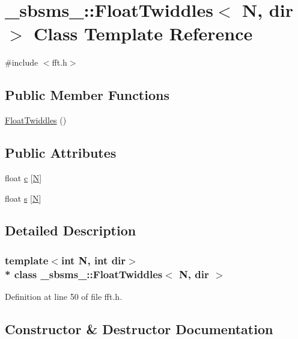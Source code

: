 \hypertarget{class__sbsms___1_1_float_twiddles}{}\section{\+\_\+sbsms\+\_\+\+:\+:Float\+Twiddles$<$ N, dir $>$ Class Template Reference}
\label{class__sbsms___1_1_float_twiddles}


{\ttfamily \#include $<$fft.\+h$>$}

\subsection*{Public Member Functions}
\begin{DoxyCompactItemize}
\item 
\hyperlink{class__sbsms___1_1_float_twiddles_afe30d2543750b6f34f1f98efee638d9a}{Float\+Twiddles} ()
\end{DoxyCompactItemize}
\subsection*{Public Attributes}
\begin{DoxyCompactItemize}
\item 
float \hyperlink{class__sbsms___1_1_float_twiddles_a57ccbfe9db2d88d4cd9d0f0b8e10a20c}{c} \mbox{[}\hyperlink{rfft2d_test_m_l_8m_af6d1246b147a7c5763d9fc83082020ff}{N}\mbox{]}
\item 
float \hyperlink{class__sbsms___1_1_float_twiddles_acb109ff9aa04d69bb2cb0a29f6a8439b}{s} \mbox{[}\hyperlink{rfft2d_test_m_l_8m_af6d1246b147a7c5763d9fc83082020ff}{N}\mbox{]}
\end{DoxyCompactItemize}


\subsection{Detailed Description}
\subsubsection*{template$<$int N, int dir$>$\\*
class \+\_\+sbsms\+\_\+\+::\+Float\+Twiddles$<$ N, dir $>$}



Definition at line 50 of file fft.\+h.



\subsection{Constructor \& Destructor Documentation}
